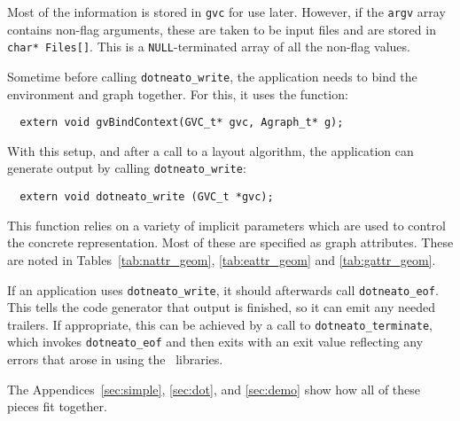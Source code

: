 Most of the information is stored in {\tt gvc} for use later. However,
if the {\tt argv} array contains non-flag arguments, these are taken
to be input files and are stored in {\tt char* Files[]}. This is a
{\tt NULL}-terminated array of all the non-flag values.

Sometime before calling \verb+dotneato_write+, the application
needs to bind the environment and graph together. For this, it uses
the function:
\begin{verbatim}
  extern void gvBindContext(GVC_t* gvc, Agraph_t* g);
\end{verbatim}
 
With this setup, and after a call to a layout algorithm, the
application can generate output by calling \verb+dotneato_write+:
\begin{verbatim}
  extern void dotneato_write (GVC_t *gvc);
\end{verbatim}
This function relies on a variety of implicit parameters which
are used to control the concrete representation. Most of these are
specified as graph attributes. These are noted in 
Tables~\ref{tab:nattr_geom}, \ref{tab:eattr_geom} and
\ref{tab:gattr_geom}.

If an application uses \verb+dotneato_write+,
it should afterwards call \verb+dotneato_eof+. 
This tells the code generator
that output is finished, so it can emit any needed trailers.
If appropriate, this can be achieved by a call to \verb+dotneato_terminate+,
which invokes \verb+dotneato_eof+ and then exits with an exit value reflecting
any errors that arose in using the \gviz\ libraries. 

The Appendices~\ref{sec:simple}, \ref{sec:dot}, and \ref{sec:demo}
show how all of these pieces fit together.

